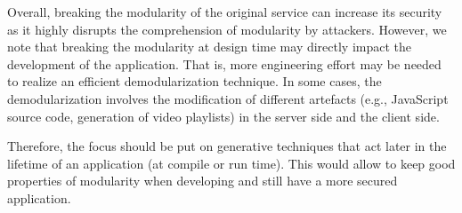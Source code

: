 
Overall, breaking the modularity of the original service can increase its security as it highly disrupts the comprehension of modularity by attackers. 
However, we note that breaking the modularity at design time may directly impact the development of the application. That is, more engineering effort may be needed to realize an efficient demodularization technique. In some cases, the demodularization involves the modification of different artefacts (e.g., JavaScript source code, generation of video playlists) in the server side and the client side.

 Therefore, the focus should be put on generative techniques that act later in the lifetime of an application (\eg at compile or run time). This would allow to keep good properties of modularity when developing and still have a more secured application. %
